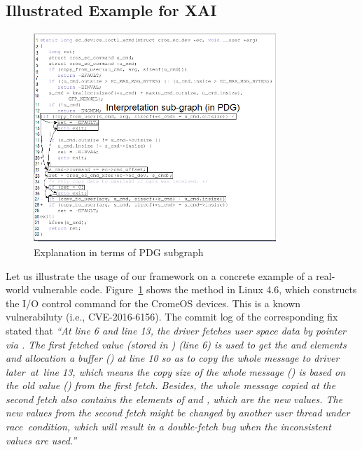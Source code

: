 
\subsection{Illustrated Example for XAI}

\begin{figure}
	\centering
	\includegraphics[width=3.6in]{pdg-2.png}
	\caption{Explanation in terms of PDG subgraph}
	\label{fig:pdg}
\end{figure}

Let us illustrate the usage of our framework on a concrete example of
a real-world vulnerable code. Figure~\ref{fig:pdg} shows the
method  in Linux 4.6, which
constructs the I/O control command for the CromeOS devices. This is a
known vulnerabiluty (i.e., CVE-2016-6156). The commit log of the
corresponding fix stated that {\em ``At line 6 and line 13, the driver
  fetches user space data by pointer  via
  . The first fetched value (stored in
  ) (line 6) is used to get the  and
   elements and allocation a buffer
  () at line 10 so as to copy the whole message to
  driver later~at~line 13, which means the copy size of the whole
  message () is based on the old value
  () from the first fetch. Besides, the whole
  message copied at the second fetch also contains the elements of
   and , which are the new
  values. The new values from the second fetch might be changed by
  another user thread under race~condition, which will result in a
  double-fetch bug when the inconsistent values are used.''}

